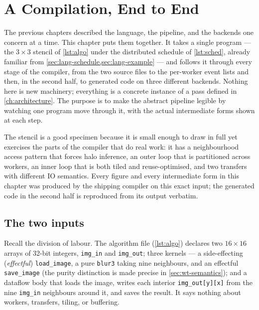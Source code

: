 \chapter{A Compilation, End to End}\label{ch:walkthrough}

The previous chapters described the language, the pipeline, and the backends one
concern at a time. This chapter puts them together. It takes a single program ---
the $3\times3$ stencil of \cref{lst:algo} under the distributed schedule of
\cref{lst:sched}, already familiar from \cref{sec:lang-schedule,sec:lang-example} --- and follows it
through every stage of the compiler, from the two source files to the per-worker
event lists and then, in the second half, to generated code on three different
backends. Nothing here is new machinery; everything is a concrete instance of a
pass defined in \cref{ch:architecture}. The purpose is to make the abstract
pipeline legible by watching one program move through it, with the actual
intermediate forms shown at each step.

The stencil is a good specimen because it is small enough to draw in full yet
exercises the parts of the compiler that do real work: it has a neighbourhood
access pattern that forces halo inference, an outer loop that is partitioned across
workers, an inner loop that is both tiled and reuse-optimised, and two transfers
with different IO semantics. Every figure and every intermediate form in this
chapter was produced by the shipping compiler on this exact input; the generated
code in the second half is reproduced from its output verbatim.

\section{The two inputs}\label{sec:wt-inputs}

Recall the division of labour. The algorithm file (\cref{lst:algo}) declares two
$16\times16$ arrays of 32-bit integers, \texttt{img\_in} and \texttt{img\_out};
three kernels --- a side-effecting (\emph{effectful}) \texttt{load\_image}, a pure
\texttt{blur3} taking nine neighbours, and an effectful \texttt{save\_image} (the
purity distinction is made precise in \cref{sec:wt-semantics}); and a dataflow body that
loads the image, writes each interior \texttt{img\_out[y][x]} from the nine
\texttt{img\_in} neighbours around it, and saves the result. It says nothing about
workers, transfers, tiling, or buffering.

